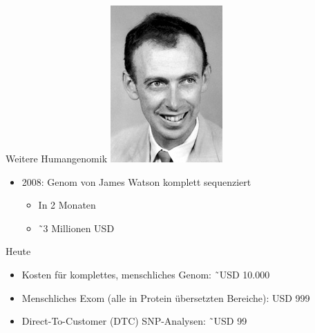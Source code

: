 \documentclass[12pt,a4paper]{beamer}
\begin{document}
\begin{frame}{Weitere Humangenomik}
	\includegraphics[scale=0.4]{watson.jpg}
	\begin{itemize}
		\item 2008: Genom von James Watson komplett sequenziert
		\begin{itemize}
			\pause \item In 2 Monaten
			\pause \item \~\ 3 Millionen USD
		\end{itemize}
	\end{itemize}
\end{frame}

\begin{frame}{Heute}
	\begin{itemize}
		\item Kosten f\"ur komplettes, menschliches Genom: \~\ USD 10.000
		\pause \item Menschliches Exom (alle in Protein \"ubersetzten Bereiche): USD 999  
		\pause \item Direct-To-Customer (DTC) SNP-Analysen: \~\ USD 99
	\end{itemize}
\end{frame}
\end{document}

